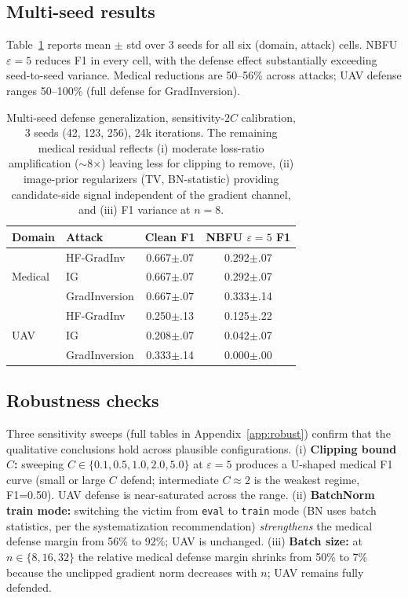 \documentclass[11pt]{article}
\begin{document}
\subsection{Multi-seed results}
Table~\ref{tab:multiseed} reports mean $\pm$ std over 3 seeds for all six (domain, attack) cells. NBFU $\varepsilon{=}5$ reduces F1 in every cell, with the defense effect substantially exceeding seed-to-seed variance. Medical reductions are 50--56\% across attacks; UAV defense ranges 50--100\% (full defense for GradInversion).

\begin{table}[t]
\centering
\small
\setlength{\tabcolsep}{4pt}
\begin{tabular}{llcc}
\toprule
Domain & Attack & Clean F1 & NBFU $\varepsilon{=}5$ F1 \\
\midrule
\multirow{3}{*}{Medical}
 & HF-GradInv     & 0.667$\pm$.07 & 0.292$\pm$.07 \\
 & IG             & 0.667$\pm$.07 & 0.292$\pm$.07 \\
 & GradInversion  & 0.667$\pm$.07 & 0.333$\pm$.14 \\
\midrule
\multirow{3}{*}{UAV}
 & HF-GradInv     & 0.250$\pm$.13 & 0.125$\pm$.22 \\
 & IG             & 0.208$\pm$.07 & 0.042$\pm$.07 \\
 & GradInversion  & 0.333$\pm$.14 & 0.000$\pm$.00 \\
\bottomrule
\end{tabular}
\caption{Multi-seed defense generalization, sensitivity-$2C$ calibration, 3 seeds (42, 123, 256), 24k iterations. The remaining medical residual reflects (i) moderate loss-ratio amplification ($\sim$8$\times$) leaving less for clipping to remove, (ii) image-prior regularizers (TV, BN-statistic) providing candidate-side signal independent of the gradient channel, and (iii) F1 variance at $n{=}8$.}
\label{tab:multiseed}
\end{table}

\subsection{Robustness checks}
\label{sec:robustness}
Three sensitivity sweeps (full tables in Appendix~\ref{app:robust}) confirm that the qualitative conclusions hold across plausible configurations. (i) \textbf{Clipping bound $C$:} sweeping $C \in \{0.1, 0.5, 1.0, 2.0, 5.0\}$ at $\varepsilon{=}5$ produces a U-shaped medical F1 curve (small or large $C$ defend; intermediate $C{\approx}2$ is the weakest regime, F1=0.50). UAV defense is near-saturated across the range. (ii) \textbf{BatchNorm train mode:} switching the victim from \texttt{eval} to \texttt{train} mode (BN uses batch statistics, per the systematization recommendation) \emph{strengthens} the medical defense margin from 56\% to 92\%; UAV is unchanged. (iii) \textbf{Batch size:} at $n \in \{8, 16, 32\}$ the relative medical defense margin shrinks from 50\% to 7\% because the unclipped gradient norm decreases with $n$; UAV remains fully defended.
\end{document}

